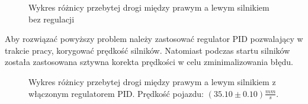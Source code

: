             \begin{figure}[!ht]
                \centering
                \caption{Wykres różnicy przebytej drogi między prawym a lewym silnikiem bez regulacji}
                \label{plot:distance_err_in_time_const_speed}
            \end{figure}

            Aby rozwiązać powyższy problem należy zastosować regulator PID pozwalający w trakcie pracy, korygować prędkość silników.
            Natomiast podczas startu silników została zastosowana sztywna korekta prędkości w celu zminimalizowania błędu.
            \begin{figure}[!ht]
                \centering
                \caption{Wykres różnicy przebytej drogi między prawym a lewym silnikiem z włączonym regulatorem PID. Prędkość pojazdu: $(35.10 \pm 0.10)\frac{mm}{s}$.}
                \label{plot:PID_distance_err_in_time}
            \end{figure}

